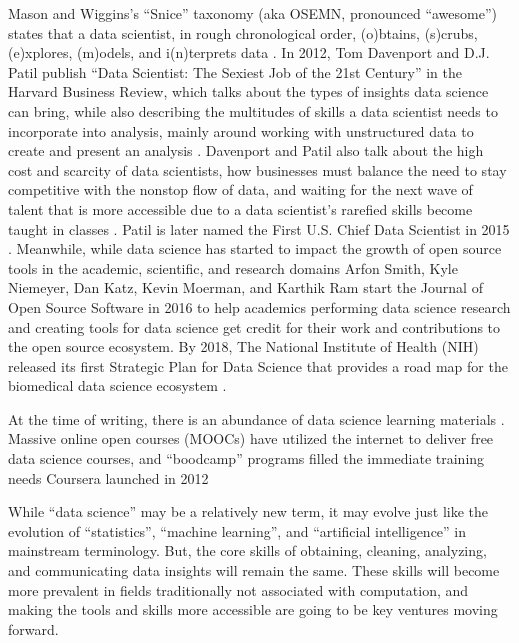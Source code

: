 \documentclass[010-intro.tex]{subfiles}
\begin{document}
    Mason and Wiggins's ``Snice'' taxonomy (aka OSEMN, pronounced ``awesome'') states that a data scientist,
    in rough chronological order,
    (o)btains, (s)crubs, (e)xplores, (m)odels, and i(n)terprets data
    \cite{masonTaxonomyDataScience2010}.
    In 2012, Tom Davenport and D.J. Patil publish
    ``Data Scientist: The Sexiest Job of the 21st Century''
    in the Harvard Business Review,
    which talks about the types of insights data science can bring,
    while also describing the multitudes of skills a data scientist needs to incorporate into analysis,
    mainly around working with unstructured data to create and present an analysis
    \cite{davenportDataScientistSexiest2012}.
    Davenport and Patil also talk about the high cost and scarcity of data scientists,
    how businesses must balance the need to stay competitive with the nonstop flow of data,
    and waiting for the next wave of talent that is more accessible
    due to a data scientist's rarefied skills become taught in classes
    \cite{davenportDataScientistSexiest2012}.
    Patil is later named the First U.S. Chief Data Scientist in 2015
    \cite{smithWhiteHouseNames2015}.
    Meanwhile, while data science has started to impact the growth of open source tools in the
    academic, scientific, and research domains
    \cite{tyagiHowFortune5002016, guszczaDataScienceOpen2015, kirschHowOpenSource2021}
    Arfon Smith, Kyle Niemeyer, Dan Katz, Kevin Moerman, and Karthik Ram start
    the Journal of Open Source Software in 2016 \cite{smithJournalOpenSource2018}
    to help academics performing data science research and creating tools for data science get
    credit for their work and contributions to the open source ecosystem.
    By 2018,
    The National Institute of Health (NIH) released its first Strategic Plan for Data Science
    that provides a road map for the biomedical data science ecosystem
    \cite{nationalinstitutesofhealthNIHStrategicPlan2020}.
    
    
    At the time of writing,
    there is an abundance of data science learning materials
    \cite{krossDemocratizationDataScience2020}.
    Massive online open courses (MOOCs) have utilized the internet to deliver free
    data science courses,
    and ``boodcamp'' programs filled the immediate training needs
    Coursera launched in 2012

    While ``data science'' may be a relatively new term,
    it may evolve just like the evolution of ``statistics'', ``machine learning'', and ``artificial intelligence''
    in mainstream terminology.
    But, the core skills of obtaining, cleaning, analyzing, and communicating data insights will remain the same.
    These skills will become more prevalent in fields traditionally not associated with computation,
    and making the tools and skills more accessible are going to be key ventures moving forward.
\end{document}

